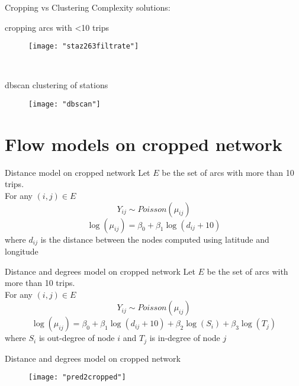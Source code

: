 \documentclass[pdf]{beamer}
\begin{document}
\begin{frame}{Cropping vs Clustering}
\centering Complexity solutions:\\[0.2cm]
\begin{minipage}{0.475\textwidth}
	\centering cropping arcs with <10 trips\\[0.1cm]
	\begin{figure}
	\centering
	\texttt{[image: "staz263filtrate"]}
	\label{fig:bikesianmibellissimo-s-e-a-modificate}
\end{figure}
\end{minipage}
~
\begin{minipage}{0.475\textwidth}
	\centering dbscan clustering of stations
	\begin{figure}
	\centering
	\texttt{[image: "dbscan"]}
	\label{fig:bikesianmibellissimo-s-e-a-modificate}
\end{figure}
\end{minipage}

\end{frame}


\section{Flow models on cropped network}

\begin{frame}{Distance model on cropped network}
Let $E$ be the set of arcs with more than 10 trips.\\[0.2cm]
For any $(i,j) \in E$
\[Y_{ij} \sim Poisson(\mu_{ij})\]
\[\log(\mu_{ij}) = \beta_0 + \beta_1 \log(d_{ij}+10)\]
where $d_{ij}$ is the distance between the nodes computed using latitude and longitude
\end{frame}

\begin{frame}{Distance and degrees model on cropped network}
Let $E$ be the set of arcs with more than 10 trips.\\[0.2cm]
For any $(i,j) \in E$
\[Y_{ij} \sim Poisson(\mu_{ij})\]
\[\log(\mu_{ij}) = \beta_0 + \beta_1  \log(d_{ij}+10) + \beta_2  \log(S_{i}) + \beta_3  \log(T_{j})\]
where $S_{i}$ is out-degree of node $i$ and $T_{j}$ is in-degree of node $j$
\end{frame}

\begin{frame}{Distance and degrees model on cropped network}
\begin{figure}
	\centering
	\texttt{[image: "pred2cropped"]}
	\label{fig:bikesianmibellissimo-s-e-a-modificate}
\end{figure}
\end{frame}
\end{document}
